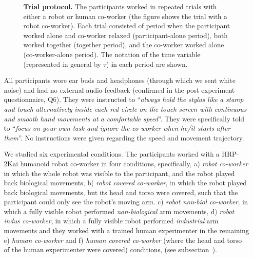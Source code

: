 \begin{figure}[hpt]
	\caption{{\bf Trial protocol.} The participants worked in repeated trials with either a robot or human co-worker (the figure shows the trial with a robot co-worker). Each trial consisted of period when the participant worked alone and co-worker relaxed (participant-alone period), both worked together (together period), and the co-worker worked alone (co-worker-alone period). The notation of the time variable (represented in general by $\tau$) in each period are shown.}
	\label{fig:trialprotocol2}
\end{figure}

All participants wore ear buds and headphones (through which we sent white noise) and had no external audio feedback (confirmed in the post experiment questionnaire, Q6). They were instructed to ``{\it always hold the stylus like a stamp and touch alternatively inside each red circle on the touch-screen with continuous and smooth hand movements at a comfortable speed}''. They were specifically told to ``{\it focus on your own task and ignore the co-worker when he/it starts after them}''. No instructions were given regarding the speed and movement trajectory.

We studied six experimental conditions. The participants worked with a HRP-2Kai humanoid robot co-worker in four conditions, specifically, a) \textit{robot co-worker} in which the whole robot was visible to the participant, and the robot played back biological movements, b) \textit{robot covered co-worker}, in which the robot played back biological movements, but its head and torso were covered, such that the participant could only see the robot's moving arm. c) \textit{robot non-biol co-worker}, in which a fully visible robot performed \textit{non-biological} arm movements, d) \textit{robot indus co-worker}, in which a fully visible robot performed \textit{industrial} arm movements and they worked with a trained human experimenter in the remaining e) \textit{human co-worker} and f) \textit{human covered co-worker} (where the head and torso of the human experimenter were covered) conditions, (see subsection~).

